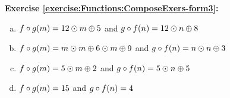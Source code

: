 \noindent\textbf{Exercise \ref{exercise:Functions:ComposeExers-form3}:}\\
\begin{enumerate}[(a)]
\item 
$f\circ g(m) = 12 \odot m \oplus 5$ and $g \circ f(n) = 12\odot n \oplus 8$
\item 
$f\circ g(m) = m \odot m \oplus 6 \odot m \oplus 9$ and $g \circ f(n) = n\odot n \oplus 3$
\item 
$f\circ g(m) = 5 \odot m \oplus 2$ and $g \circ f(n) = 5\odot n \oplus 5$
\item 
$f\circ g(m) = 15$ and $g \circ f(n) = 4$
\end{enumerate}


